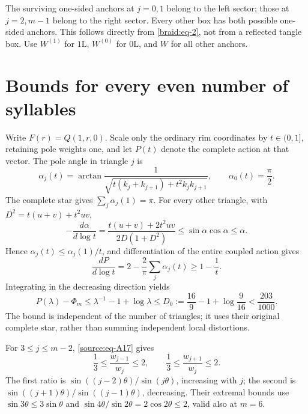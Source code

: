 \documentclass[11pt]{article}
\numberwithin{equation}{section}
\begin{document}
The surviving one-sided anchors at \(j=0,1\) belong to the left sector; those at
\(j=2,m-1\) belong to the right sector. Every other box has both possible one-sided
anchors. This follows directly from \eqref{braid:eq-2}, not from a reflected tangle box. Use \(W^{(1)}\) for \(1\mathrm L\), \(W^{(0)}\) for
\(0\mathrm L\), and \(W\) for all other anchors.

\section{Bounds for every even number of
syllables}\label{source:sec-5}

Write \(F(r)=Q(1,r,0)\). Scale only the ordinary rim coordinates by
\(t\in(0,1]\), retaining pole weights one, and let \(P(t)\) denote the
complete action at that vector. The pole angle in triangle \(j\) is \begin{equation}\label{source:eq-A21}
\alpha_j(t)=\arctan\frac1{\sqrt{t(k_j+k_{j+1})+t^2k_jk_{j+1}}},
 \qquad \alpha_0(t)=\frac\pi2.
\end{equation} The complete star gives \(\sum_j\alpha_j(1)=\pi\). For every other
triangle, with \(D^2=t(u+v)+t^2uv\), \begin{equation}\label{source:eq-A22}
-\frac{d\alpha}{d\log t}
 =\frac{t(u+v)+2t^2uv}{2D(1+D^2)}
 \le\sin\alpha\cos\alpha\le\alpha.
\end{equation} Hence \(\alpha_j(t)\le\alpha_j(1)/t\), and differentiation of the
entire coupled action gives \[
 \frac{dP}{d\log t}=2-\frac2\pi\sum_j\alpha_j(t)
       \ge1-\frac1t.
\] Integrating in the decreasing direction yields \begin{equation}\label{source:eq-A23}
P(\lambda)-\Phi_m\le\lambda^{-1}-1+\log\lambda
       \le D_0:=\frac{16}9-1+\log\frac9{16}<\frac{203}{1000}.
\end{equation} The bound is independent of the number of triangles; it uses their
original complete star, rather than summing independent local
distortions.

For \(3\le j\le m-2\), \eqref{source:eq-A17} gives \begin{equation}\label{source:eq-A24}
\frac13\le\frac{w_{j-1}}{w_j}\le2,
 \qquad \frac13\le\frac{w_{j+1}}{w_j}\le2.
\end{equation} The first ratio is \(\sin((j-2)\theta)/\sin(j\theta)\), increasing
with \(j\); the second is \(\sin((j+1)\theta)/\sin((j-1)\theta)\),
decreasing. Their extremal bounds use \(\sin3\theta\le3\sin\theta\) and
\(\sin4\theta/\sin2\theta=2\cos2\theta\le2\), valid also at \(m=6\).
\end{document}
